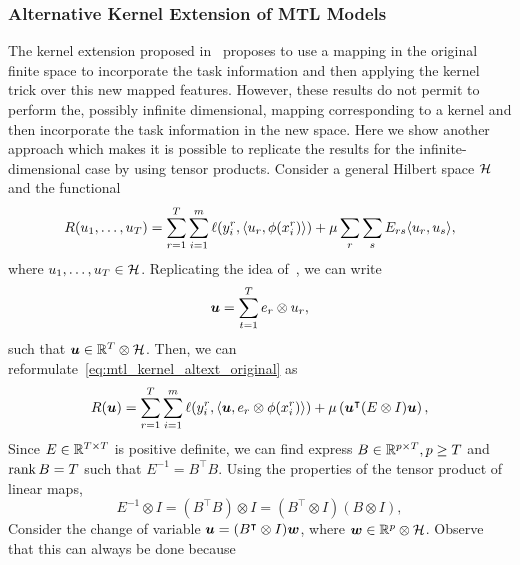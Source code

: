 \subsubsection*{Alternative Kernel Extension of MTL Models}
The kernel extension proposed in~\cite{EvgeniouMP05} proposes to use a mapping in the original finite space to incorporate the task information and then applying the kernel trick over this new mapped features. However, these results do not permit to perform the, possibly infinite dimensional, mapping corresponding to a kernel and then incorporate the task information in the new space.
Here we show another approach which makes it is possible to replicate the results for the infinite-dimensional case by using tensor products. Consider a general Hilbert space $\mathcal{H}$ and the functional
\begin{equation}
    \label{eq:mtl_kernel_altext_original}
    \begin{aligned}
        &R({u_1, \ldots, u_T}) = \sum_{r=1}^{\ntasks} \sum_{i=1}^\npertask \lossf(y_i^r, \dotp{u_r}{\phi(x_i^r)}) + \mu \sum_r \sum_s E_{rs} \dotp{u_r}{u_s} ,\\
    \end{aligned}
\end{equation}
where $u_1, \ldots, u_T \in \mathcal{H}$.
Replicating the idea of~\cite{EvgeniouMP05}, we can write
$$ \bm{u} = \sum_{t=1}^T e_r \otimes u_r ,$$
such that $\bm{u} \in \mathbb{R}^T \otimes \mathcal{H}$. Then, we can reformulate~\eqref{eq:mtl_kernel_altext_original} as
\begin{equation}
    \label{eq:mtl_kernel_altext_tensor}
    \begin{aligned}
        &R(\myvec{u}) = \sum_{r=1}^{\ntasks} \sum_{i=1}^\npertask \lossf(y_i^r, \dotp{\myvec{u}}{e_r \otimes \phi(x_i^r)}) + \mu \left(  \myvec{u}^\intercal (E \otimes I) \myvec{u} \right),\\
    \end{aligned}
\end{equation}
Since ${E} \in \mathbb{R}^{T \times T}$ is positive definite, we can find express $B \in \mathbb{R}^{p \times T}, p \geq T$ and $\operatorname{rank}{B} = T$ such that $E^{-1} = 
{B^\intercal} {B}$. Using the properties of the tensor product of linear maps,  $$ E^{-1} \otimes I = (B^\intercal B) \otimes I = (B^\intercal \otimes I) (B \otimes I),$$
%
Consider the change of variable $\bm{u} = (B^\intercal \otimes I)\bm{w}$, where $\bm{w} \in \mathbb{R}^p \otimes \mathcal{H}$. Observe that this can always be done because 
